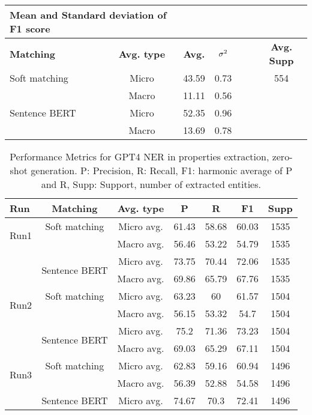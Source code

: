 \begin{table}[htbp]
\begin{tabular}{lcccccc}
    \midrule
    \multicolumn{2}{l}{\textbf{Mean and Standard deviation of F1 score}} & & & & & \\
    \midrule
    \textbf{Matching} & \textbf{Avg. type} & \textbf{Avg.} & $\sigma\textsuperscript{2}$ & & & \textbf{Avg. Supp}\\
    Soft matching & Micro & 43.59 & 0.73 & & & 554 \\
    & Macro & 11.11 & 0.56 & & & \\
    Sentence BERT & Micro & 52.35 & 0.96 & & & \\
    & Macro  & 13.69 & 0.78 & & & \\
    \bottomrule
  \end{tabular}
\end{table}


\begin{table}[htbp]
\small
  \centering
  \caption{Performance Metrics for GPT4 NER in properties extraction, zero-shot generation. P: Precision, R: Recall, F1: harmonic average of P and R, Supp: Support, number of extracted entities.}
  \begin{tabular}{lcccccc}
    \toprule
    \textbf{Run} & \textbf{Matching} & \textbf{Avg. type} & \textbf{P} & \textbf{R} & \textbf{F1} & \textbf{Supp} \\
    \midrule
    \multirow{2}{*}{Run1} & Soft matching & Micro avg. & 61.43 & 58.68 & 60.03 & 1535 \\
    & & Macro avg. & 56.46 & 53.22 & 54.79 & 1535 \\
    \cmidrule{2-7}
    & \multirow{2}{*}{Sentence BERT} & Micro avg. & 73.75 & 70.44 & 72.06 & 1535 \\
    & & Macro avg. & 69.86 & 65.79 & 67.76 & 1535 \\
    \midrule
    \multirow{2}{*}{Run2} & Soft matching & Micro avg. & 63.23 & 60 & 61.57 & 1504 \\
    & & Macro avg. & 56.15 & 53.32 & 54.7 & 1504 \\
    \cmidrule{2-7}
    & \multirow{2}{*}{Sentence BERT} & Micro avg. & 75.2 & 71.36 & 73.23 & 1504 \\
    & & Macro avg. & 69.03 & 65.29 & 67.11 & 1504 \\
    \midrule
    \multirow{2}{*}{Run3} & Soft matching & Micro avg. & 62.83 & 59.16 & 60.94 & 1496 \\
    & & Macro avg. & 56.39 & 52.88 & 54.58 & 1496 \\
    \cmidrule{2-7}
    & \multirow{2}{*}{Sentence BERT} & Micro avg. & 74.67 & 70.3 & 72.41 & 1496 \\

\end{tabular}
\end{table}
